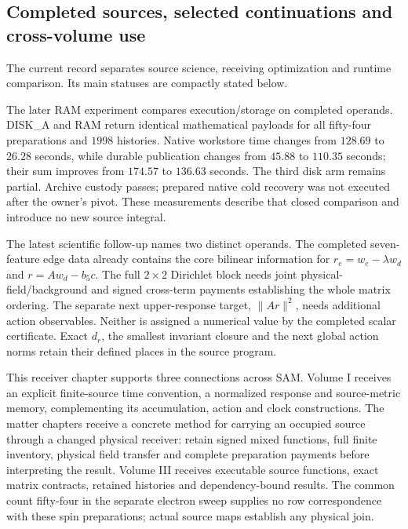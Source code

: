 \subsection{Completed sources, selected continuations and cross-volume use}

The current record separates source science, receiving optimization and runtime comparison. Its main statuses are compactly stated below.



The later RAM experiment compares execution/storage on completed operands. DISK\_A and RAM return identical mathematical payloads for all fifty-four preparations and $1998$ histories. Native workstore time changes from $128.69$ to $26.28$ seconds, while durable publication changes from $45.88$ to $110.35$ seconds; their sum improves from $174.57$ to $136.63$ seconds. The third disk arm remains partial. Archive custody passes; prepared native cold recovery was not executed after the owner's pivot. These measurements describe that closed comparison and introduce no new source integral. 

The latest scientific follow-up names two distinct operands. The completed seven-feature edge data already contains the core bilinear information for $r_e=w_e-\lambda w_d$ and $r=Aw_d-b_5c$. The full $2\times2$ Dirichlet block needs joint physical-field/background and signed cross-term payments establishing the whole matrix ordering. The separate next upper-response target, $\|Ar\|^2$, needs additional action observables. Neither is assigned a numerical value by the completed scalar certificate. Exact $d_r$, the smallest invariant closure and the next global action norms retain their defined places in the source program. 

This receiver chapter supports three connections across SAM. Volume I receives an explicit finite-source time convention, a normalized response and source-metric memory, complementing its accumulation, action and clock constructions. The matter chapters receive a concrete method for carrying an occupied source through a changed physical receiver: retain signed mixed functions, full finite inventory, physical field transfer and complete preparation payments before interpreting the result. Volume III receives executable source functions, exact matrix contracts, retained histories and dependency-bound results. The common count fifty-four in the separate electron sweep supplies no row correspondence with these spin preparations; actual source maps establish any physical join.

